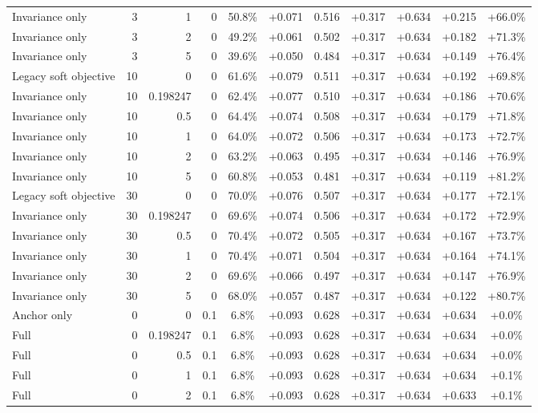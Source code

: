 \begin{table}[htbp]
\begin{tabular}{lrrrccccccc}
Invariance only & 3 & 1 & 0 & 50.8\% & +0.071 & 0.516 & +0.317 & +0.634 & +0.215 & +66.0\% \\
Invariance only & 3 & 2 & 0 & 49.2\% & +0.061 & 0.502 & +0.317 & +0.634 & +0.182 & +71.3\% \\
Invariance only & 3 & 5 & 0 & 39.6\% & +0.050 & 0.484 & +0.317 & +0.634 & +0.149 & +76.4\% \\
Legacy soft objective & 10 & 0 & 0 & 61.6\% & +0.079 & 0.511 & +0.317 & +0.634 & +0.192 & +69.8\% \\
Invariance only & 10 & 0.198247 & 0 & 62.4\% & +0.077 & 0.510 & +0.317 & +0.634 & +0.186 & +70.6\% \\
Invariance only & 10 & 0.5 & 0 & 64.4\% & +0.074 & 0.508 & +0.317 & +0.634 & +0.179 & +71.8\% \\
Invariance only & 10 & 1 & 0 & 64.0\% & +0.072 & 0.506 & +0.317 & +0.634 & +0.173 & +72.7\% \\
Invariance only & 10 & 2 & 0 & 63.2\% & +0.063 & 0.495 & +0.317 & +0.634 & +0.146 & +76.9\% \\
Invariance only & 10 & 5 & 0 & 60.8\% & +0.053 & 0.481 & +0.317 & +0.634 & +0.119 & +81.2\% \\
Legacy soft objective & 30 & 0 & 0 & 70.0\% & +0.076 & 0.507 & +0.317 & +0.634 & +0.177 & +72.1\% \\
Invariance only & 30 & 0.198247 & 0 & 69.6\% & +0.074 & 0.506 & +0.317 & +0.634 & +0.172 & +72.9\% \\
Invariance only & 30 & 0.5 & 0 & 70.4\% & +0.072 & 0.505 & +0.317 & +0.634 & +0.167 & +73.7\% \\
Invariance only & 30 & 1 & 0 & 70.4\% & +0.071 & 0.504 & +0.317 & +0.634 & +0.164 & +74.1\% \\
Invariance only & 30 & 2 & 0 & 69.6\% & +0.066 & 0.497 & +0.317 & +0.634 & +0.147 & +76.9\% \\
Invariance only & 30 & 5 & 0 & 68.0\% & +0.057 & 0.487 & +0.317 & +0.634 & +0.122 & +80.7\% \\
Anchor only & 0 & 0 & 0.1 & 6.8\% & +0.093 & 0.628 & +0.317 & +0.634 & +0.634 & +0.0\% \\
Full & 0 & 0.198247 & 0.1 & 6.8\% & +0.093 & 0.628 & +0.317 & +0.634 & +0.634 & +0.0\% \\
Full & 0 & 0.5 & 0.1 & 6.8\% & +0.093 & 0.628 & +0.317 & +0.634 & +0.634 & +0.0\% \\
Full & 0 & 1 & 0.1 & 6.8\% & +0.093 & 0.628 & +0.317 & +0.634 & +0.634 & +0.1\% \\
Full & 0 & 2 & 0.1 & 6.8\% & +0.093 & 0.628 & +0.317 & +0.634 & +0.633 & +0.1\% \\

\end{tabular}
\end{table}
